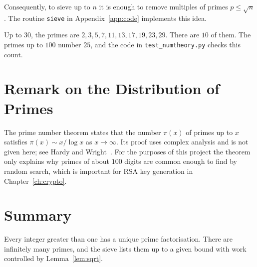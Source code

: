 Consequently, to sieve up to $n$ it is enough to remove multiples of primes $p\le\sqrt{n}$. The routine \texttt{sieve} in Appendix~\ref{app:code} implements this idea.

\begin{example}
Up to $30$, the primes are $2,3,5,7,11,13,17,19,23,29$. There are $10$ of them. The primes up to $100$ number $25$, and the code in \texttt{test\_numtheory.py} checks this count.
\end{example}

\section{Remark on the Distribution of Primes}

The prime number theorem states that the number $\pi(x)$ of primes up to $x$ satisfies $\pi(x)\sim x/\log x$ as $x\to\infty$. Its proof uses complex analysis and is not given here; see Hardy and Wright~\cite{hardy2008}. For the purposes of this project the theorem only explains why primes of about $100$ digits are common enough to find by random search, which is important for RSA key generation in Chapter~\ref{ch:crypto}.

\section{Summary}

Every integer greater than one has a unique prime factorisation. There are infinitely many primes, and the sieve lists them up to a given bound with work controlled by Lemma~\ref{lem:sqrt}.
